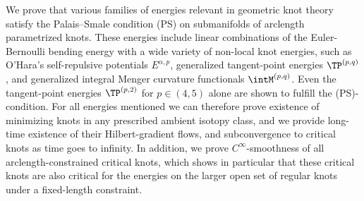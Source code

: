 We prove that various families of energies relevant in 
geometric knot theory satisfy the Palais--Smale condition (PS)
on submanifolds of arclength para\-metrized knots. 
These energies
include linear combinations of the Euler-Bernoulli
bending energy with a wide variety of non-local
knot energies, such as
O'Hara's self-repulsive potentials $E^{\alpha,p}$, generalized
tangent-point energies $\TP^{(p,q)}$, and generalized integral
Menger curvature functionals $\intM^{(p,q)}$. Even the
tangent-point energies $\TP^{(p,2)}$ for $p\in (4,5)$ alone
are shown to fulfill the (PS)-condition. For all energies mentioned
we can therefore prove existence of minimizing knots in any prescribed
ambient isotopy class, and we
provide long-time existence of their Hilbert-gradient flows, 
and subconvergence to critical knots as time goes to infinity.
In addition, we prove $C^\infty$-smoothness of all arclength-constrained 
critical knots, which shows in particular that these critical knots
are also critical for the energies on the larger open set of
regular knots under a fixed-length constraint.